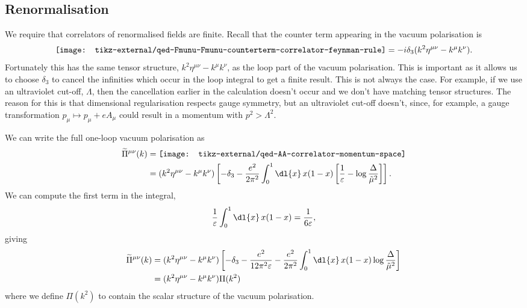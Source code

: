 \documentclass[fleqn]{NotesClass}
\newcommand{\minkowskiMetric}{\eta}
\begin{document}
    \subsection{Renormalisation}
    We require that correlators of renormalised fields are finite.
    Recall that the counter term appearing in the vacuum polarisation is
    \begin{equation}
        \vcenter{\hbox{\texttt{[image: tikz-external/qed-Fmunu-Fmunu-counterterm-correlator-feynman-rule]}}} = -i\delta_3(k^2\minkowskiMetric^{\mu\nu} - k^\mu k^\nu).
    \end{equation}
    Fortunately this has the same tensor structure, \(k^2 \minkowskiMetric^{\mu\nu} - k^\mu k^\nu\), as the loop part of the vacuum polarisation.
    This is important as it allows us to choose \(\delta_3\) to cancel the infinities which occur in the loop integral to get a finite result.
    This is not always the case.
    For example, if we use an ultraviolet cut-off, \(\Lambda\), then the cancellation earlier in the calculation doesn't occur and we don't have matching tensor structures.
    The reason for this is that dimensional regularisation respects gauge symmetry, but an ultraviolet cut-off doesn't, since, for example, a gauge transformation \(p_\mu \mapsto p_\mu + eA_\mu\) could result in a momentum with \(p^2 > \Lambda^2\).
    
    We can write the full one-loop vacuum polarisation as
    \begin{align}
        \widetilde{\Pi}^{\mu\nu}(k) &= 
        \vcenter{\hbox{\texttt{[image: tikz-external/qed-AA-correlator-momentum-space]}}}\\
        &= (k^2 \minkowskiMetric^{\mu\nu} - k^\mu k^\nu) \left[ -\delta_3 - \frac{e^2}{2\pi^2} \int_0^1 \dl{x} \, x(1 - x)\left[ \frac{1}{\varepsilon} - \log \frac{\Delta}{\tilde{\mu}^2} \right] \right].\notag
    \end{align}
    We can compute the first term in the integral,
    \begin{equation}
        \frac{1}{\varepsilon} \int_0^1 \dl{x} \, x(1 - x) = \frac{1}{6\varepsilon},
    \end{equation}
    giving
    \begin{align}
        \widetilde{\Pi}^{\mu\nu}(k) &= (k^2 \minkowskiMetric^{\mu\nu} - k^\mu k^\nu) \left[ -\delta_3 - \frac{e^2}{12\pi^2\varepsilon} - \frac{e^2}{2\pi^2} \int_0^1 \dl{x} \, x(1 - x) \log\frac{\Delta}{\tilde{\mu}^2} \right] \notag\\
        &= (k^2 \minkowskiMetric^{\mu\nu} - k^\mu k^\nu) \Pi(k^2)
    \end{align}
    where we define \(\Pi(k^2)\) to contain the scalar structure of the vacuum polarisation.
    
\end{document}

